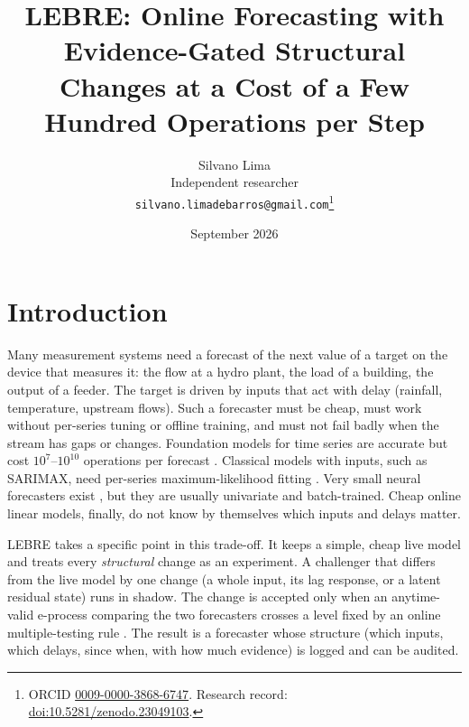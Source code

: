 \documentclass[11pt]{article}
\title{LEBRE: Online Forecasting with Evidence-Gated Structural Changes at a Cost of a Few Hundred Operations per Step}
\author{Silvano Lima\\[2pt]{\normalsize Independent researcher}\\{\normalsize\texttt{silvano.limadebarros@gmail.com}}\thanks{ORCID \href{https://orcid.org/0009-0000-3868-6747}{0009-0000-3868-6747}. Research record: \href{https://doi.org/10.5281/zenodo.23049103}{doi:10.5281/zenodo.23049103}.}}
\date{September 2026}
\theoremstyle{remark}
\begin{document}
\maketitle

\begin{abstract}

\end{abstract}

\section{Introduction}

Many measurement systems need a forecast of the next value of a target on the device that measures it: the flow at a hydro plant, the load of a building, the output of a feeder. The target is driven by inputs that act with delay (rainfall, temperature, upstream flows). Such a forecaster must be cheap, must work without per-series tuning or offline training, and must not fail badly when the stream has gaps or changes. Foundation models for time series are accurate but cost $10^7$--$10^{10}$ operations per forecast \citep{ansari2025chronos2,ekambaram2024ttm}. Classical models with inputs, such as SARIMAX, need per-series maximum-likelihood fitting \citep{boxjenkins1970}. Very small neural forecasters exist \citep{lin2024sparsetsf,xu2024fits}, but they are usually univariate and batch-trained. Cheap online linear models, finally, do not know by themselves which inputs and delays matter.

LEBRE takes a specific point in this trade-off. It keeps a simple, cheap live model and treats every \emph{structural} change as an experiment. A challenger that differs from the live model by one change (a whole input, its lag response, or a latent residual state) runs in shadow. The change is accepted only when an anytime-valid e-process \citep{ramdas2023savi,grunwald2024safe} comparing the two forecasters \citep{choe2024comparing} crosses a level fixed by an online multiple-testing rule \citep{javanmard2018lond,xu2024elond}. The result is a forecaster whose structure (which inputs, which delays, since when, with how much evidence) is logged and can be audited.
\end{document}
